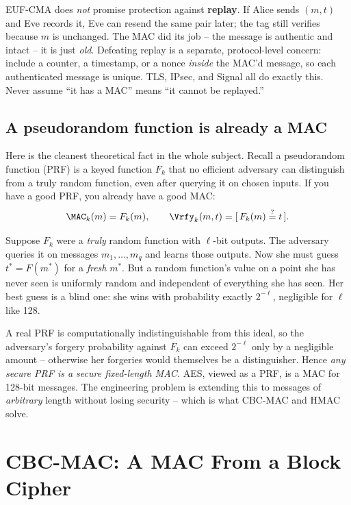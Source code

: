 \begin{trapbox}
EUF-CMA does \emph{not} promise protection against \textbf{replay}. If Alice sends $(m,t)$ and Eve records it, Eve can resend the same pair later; the tag still verifies because $m$ is unchanged. The MAC did its job -- the message is authentic and intact -- it is just \emph{old}. Defeating replay is a separate, protocol-level concern: include a counter, a timestamp, or a nonce \emph{inside} the MAC'd message, so each authenticated message is unique. TLS, IPsec, and Signal all do exactly this. Never assume ``it has a MAC'' means ``it cannot be replayed.''
\end{trapbox}

\subsection{A pseudorandom function is already a MAC}
\label{ch15:prf-is-mac}

Here is the cleanest theoretical fact in the whole subject. Recall a pseudorandom function (PRF) is a keyed function $F_k$ that no efficient adversary can distinguish from a truly random function, even after querying it on chosen inputs. If you have a good PRF, you already have a good MAC:
\[
  \MAC_k(m) = F_k(m),\qquad \Vrfy_k(m,t) = [\,F_k(m)\stackrel{?}{=}t\,].
\]

\begin{whybox}
Suppose $F_k$ were a \emph{truly} random function with $\ell$-bit outputs. The adversary queries it on messages $m_1,\dots,m_q$ and learns those outputs. Now she must guess $t^* = F(m^*)$ for a \emph{fresh} $m^*$. But a random function's value on a point she has never seen is uniformly random and independent of everything she has seen. Her best guess is a blind one: she wins with probability exactly $2^{-\ell}$, negligible for $\ell$ like 128.

A real PRF is computationally indistinguishable from this ideal, so the adversary's forgery probability against $F_k$ can exceed $2^{-\ell}$ only by a negligible amount -- otherwise her forgeries would themselves be a distinguisher. Hence \emph{any secure PRF is a secure fixed-length MAC.} AES, viewed as a PRF, is a MAC for 128-bit messages. The engineering problem is extending this to messages of \emph{arbitrary} length without losing security -- which is what CBC-MAC and HMAC solve.
\end{whybox}

\section{CBC-MAC: A MAC From a Block Cipher}
\label{ch15:cbc-mac}


